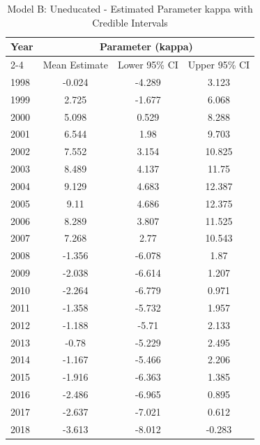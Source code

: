 \begin{landscape}
\begin{table}[htbp]
\centering
\caption{Model B: Uneducated - Estimated Parameter kappa  with Credible Intervals}
\label{tab:Fparameters_k5}
\begin{tabular}{@{}lccc@{}}
\toprule
Year & \multicolumn{3}{c}{Parameter (kappa)} \\
\cmidrule(lr){2-4}
      & Mean Estimate & Lower 95\% CI & Upper 95\% CI \\
\midrule
1998 & -0.024 & -4.289 & 3.123 \\
1999 & 2.725 & -1.677 & 6.068 \\
2000 & 5.098 & 0.529 & 8.288 \\
2001 & 6.544 & 1.98 & 9.703 \\
2002 & 7.552 & 3.154 & 10.825 \\
2003 & 8.489 & 4.137 & 11.75 \\
2004 & 9.129 & 4.683 & 12.387 \\
2005 & 9.11 & 4.686 & 12.375 \\
2006 & 8.289 & 3.807 & 11.525 \\
2007 & 7.268 & 2.77 & 10.543 \\
2008 & -1.356 & -6.078 & 1.87 \\
2009 & -2.038 & -6.614 & 1.207 \\
2010 & -2.264 & -6.779 & 0.971 \\
2011 & -1.358 & -5.732 & 1.957 \\
2012 & -1.188 & -5.71 & 2.133 \\
2013 & -0.78 & -5.229 & 2.495 \\
2014 & -1.167 & -5.466 & 2.206 \\
2015 & -1.916 & -6.363 & 1.385 \\
2016 & -2.486 & -6.965 & 0.895 \\
2017 & -2.637 & -7.021 & 0.612 \\
2018 & -3.613 & -8.012 & -0.283 \\
\bottomrule
\end{tabular}
\end{table}
\end{landscape}